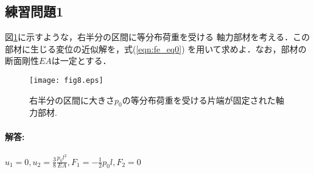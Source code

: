 \documentclass[10pt,a4j]{jarticle}
\begin{document}
\subsection{練習問題1}
図\ref{fig:fig8}に示すような，右半分の区間に等分布荷重を受ける
軸力部材を考える．この部材に生じる変位の近似解を，式(\ref{eqn:fe_eq0})
を用いて求めよ．なお，部材の断面剛性$EA$は一定とする．
\begin{figure}[h]
	\begin{center}
	\texttt{[image: fig8.eps]} 
	\end{center}
	\caption{右半分の区間に大きさ$p_0$の等分布荷重を受ける片端が固定された軸力部材.} 
	\label{fig:fig8}
\end{figure}
\paragraph{解答:}$u_1=0,u_2=\frac{3}{8}\frac{p_0l^2}{EA}, F_1=-\frac{1}{2}p_0l, F_2=0$
\end{document}

